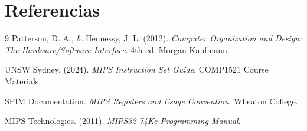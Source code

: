 \documentclass[12pt]{article}
\begin{document}
\section{Referencias}

\begin{thebibliography}{9}
        Patterson, D. A., \& Hennessy, J. L. (2012). \textit{Computer Organization and Design: The Hardware/Software Interface}. 4th ed. Morgan Kaufmann.
    
        UNSW Sydney. (2024). \textit{MIPS Instruction Set Guide}. COMP1521 Course Materials.
    
        SPIM Documentation. \textit{MIPS Registers and Usage Convention}. Wheaton College.
    
        MIPS Technologies. (2011). \textit{MIPS32 74Kc Programming Manual}.
\end{thebibliography}
\end{document}
